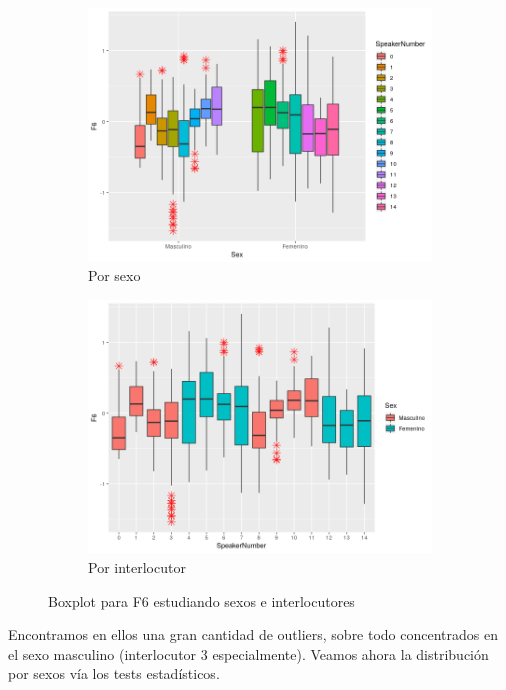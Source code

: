 \begin{figure}[H]
	\centering
	\begin{subfigure}{.5\textwidth}
		\centering
		\includegraphics[width=.9\linewidth]{bps6.png}
		\caption{Por sexo}
		\label{fig:bps6}
	\end{subfigure}%
	\begin{subfigure}{.5\textwidth}
		\centering
		\includegraphics[width=.9\linewidth]{bpsn6.png}
		\caption{Por interlocutor}
		\label{fig:bpsn6}
	\end{subfigure}
	\caption{Boxplot para F6 estudiando sexos e interlocutores}
	\label{fig:bf6}
\end{figure}

Encontramos en ellos una gran cantidad de outliers, sobre todo concentrados en el sexo masculino (interlocutor 3 especialmente). Veamos ahora la distribución por sexos vía los tests estadísticos.

